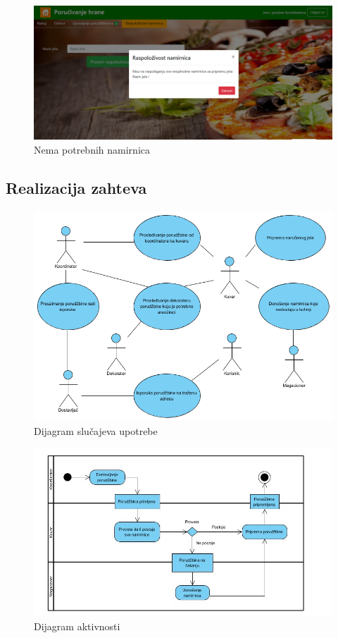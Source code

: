 \begin{figure}[!h]
    \includegraphics[width=1\textwidth]{slike/nedovoljno_namirnica.png}
    \caption{Nema potrebnih namirnica} %
    \label{fig:slika_kontakt}
\end{figure}

\newpage

\subsection{Realizacija zahteva}
\begin{figure}[!h]
    \includegraphics[width=1\textwidth]{slike/Realizacija_zahteva.png}
    \caption{Dijagram slu\v cajeva upotrebe} %
    \label{fig:slika_rel_zahteva}
\end{figure}
 \begin{figure}[!h]
    \includegraphics[width=1\textwidth]{slike/Realizacija_zahteva_dijagram_aktivnosti.jpg}
    \caption{Dijagram aktivnosti} %
    \label{fig:dij_akt}
\end{figure}
\newpage
